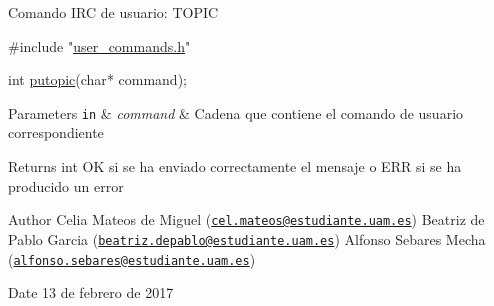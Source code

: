 Comando I\-R\-C de usuario\-: T\-O\-P\-I\-C


\begin{DoxyCode}
\textcolor{preprocessor}{#include "\hyperlink{user__commands_8h}{user\_commands.h}"}

\textcolor{keywordtype}{int} \hyperlink{user__commands_8h_a0a15138d8927dd543805edcc035b8132}{putopic}(\textcolor{keywordtype}{char}* command);
\end{DoxyCode}



\begin{DoxyParams}[1]{Parameters}
\mbox{\tt in}  & {\em command} & Cadena que contiene el comando de usuario correspondiente\\
\hline
\end{DoxyParams}
\begin{DoxyReturn}{Returns}
int O\-K si se ha enviado correctamente el mensaje o E\-R\-R si se ha producido un error
\end{DoxyReturn}
\begin{DoxyAuthor}{Author}
Celia Mateos de Miguel (\href{mailto:cel.mateos@estudiante.uam.es}{\tt cel.\-mateos@estudiante.\-uam.\-es}) Beatriz de Pablo Garcia (\href{mailto:beatriz.depablo@estudiante.uam.es}{\tt beatriz.\-depablo@estudiante.\-uam.\-es}) Alfonso Sebares Mecha (\href{mailto:alfonso.sebares@estudiante.uam.es}{\tt alfonso.\-sebares@estudiante.\-uam.\-es})
\end{DoxyAuthor}
\begin{DoxyDate}{Date}
13 de febrero de 2017
\end{DoxyDate}


 
